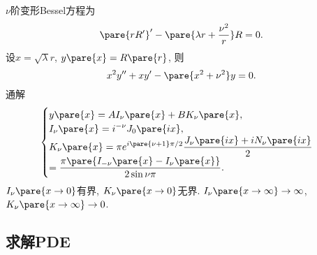\documentclass[hidelinks]{ctexart}
\begin{document}
$\nu$阶变形Bessel方程为
\[ \pare{rR'}' - \pare{\lambda r + \frac{\nu^2}{r}}R = 0. \]
设$x = \sqrt{\lambda}r$, $y\pare{x} = R\pare{r}$, 则
\[ x^2y'' + xy' - \pare{x^2+\nu^2} y = 0. \]
通解
\[ \begin{cases}
    \displaystyle y\pare{x} = AI_\nu\pare{x} + BK_\nu\pare{x}, \\
    \displaystyle I_\nu\pare{x} = i^{-\nu} J_0\pare{ix}, \\
    \displaystyle K_\nu\pare{x} = \pi e^{i\pare{\nu+1}\pi/2}\frac{J_\nu\pare{ix} + iN_\nu\pare{ix}}{2} \\
    \displaystyle = \frac{\pi\pare{I_{-\nu}\pare{x} - I_\nu\pare{x}}}{2\sin \nu\pi}.
\end{cases} \]
$I_\nu\pare{x\rightarrow 0}$有界, $K_\nu\pare{x\rightarrow 0}$无界. $I_\nu\pare{x\rightarrow \infty}\rightarrow \infty$, $K_\nu\pare{x\rightarrow \infty}\rightarrow 0$. 




\subsection{求解PDE} %
\label{sub:求解pde}
\end{document}
